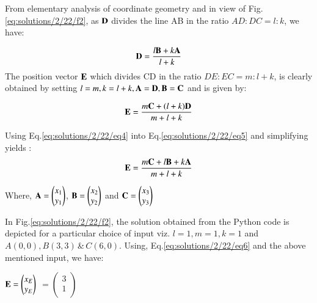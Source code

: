 From elementary analysis of coordinate geometry and in view of Fig.\ref{eq:solutions/2/22/f2}, as $\bf{D}$ divides the line AB in the ratio $AD:DC=l:k$, we have:

\begin{equation}
 {\bf{D}}=\frac{l{\bf{B}}+k\bf{A}}{l+k}
    \label{eq:solutions/2/22/eq4}
\end{equation}
The position vector $\bf{E}$ which  divides CD in the ratio $DE:EC=m:l+k$,  is clearly obtained by setting $l=m,k=l+k,\bf{A=D,B=C}$ and is given by: 

\begin{equation}
 {\bf{E}}=\frac{m{\bf{C}}+(l+k)\bf{D}}{m+l+k}
    \label{eq:solutions/2/22/eq5}
\end{equation}
 
Using Eq.\ref{eq:solutions/2/22/eq4} into Eq.\ref{eq:solutions/2/22/eq5} and simplifying yields :
\begin{equation}
 {\bf{E}}=\frac{m {\bf{C}}+l{\bf{B}}+k{\bf{A}}}{m+l+k}
    \label{eq:solutions/2/22/eq6}
\end{equation}

Where,
 $  \bf{A}  = \begin{pmatrix}
           x_{1} \\
           y_{1} \\
         \end{pmatrix}$, $ \bf{B}  = \begin{pmatrix}
           x_{2} \\
           y_{2} \\
         \end{pmatrix}$  and $  \bf{C}  = \begin{pmatrix}
           x_{3} \\
           y_{3} \\
         \end{pmatrix}$
         
In Fig.\ref{eq:solutions/2/22/f2}, the solution obtained from the Python code is depicted for a particular choice of input viz. $l=1,m=1,k=1$ and $A(0,0),B(3,3)\, $\&$\, C(6,0)$.
Using, Eq.\ref{eq:solutions/2/22/eq6} and the above mentioned input, we have:

$  \bf{E}  = \begin{pmatrix}
           x_{E} \\
           y_{E} \\
         \end{pmatrix}$ $=\begin{pmatrix}
           3 \\
           1 \\
         \end{pmatrix}$



